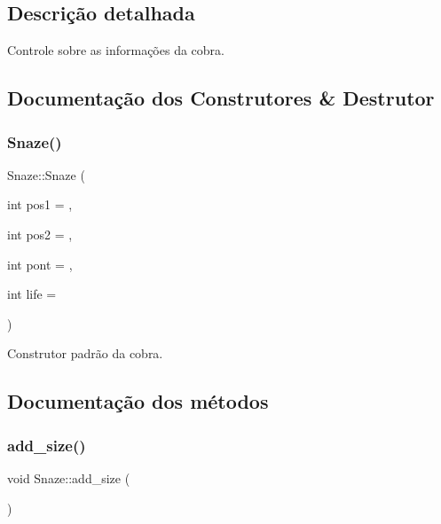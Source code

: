 \subsection{Descrição detalhada}
Controle sobre as informações da cobra. 

\subsection{Documentação dos Construtores \& Destrutor}
\mbox{\label{classSnaze_adfe6d312b7839c8e81d9c05c43367870}} 
\subsubsection{\texorpdfstring{Snaze()}{Snaze()}}
{\footnotesize\ttfamily Snaze\+::\+Snaze (\begin{DoxyParamCaption}\item[{int}]{pos1 = {},  }\item[{int}]{pos2 = {},  }\item[{int}]{pont = {},  }\item[{int}]{life = {} }\end{DoxyParamCaption})\hspace{0.3cm}{\ttfamily [inline]}}



Construtor padrão da cobra. 



\subsection{Documentação dos métodos}
\mbox{\label{classSnaze_a1746ce635a204cc0bd4544e6cfbcbdbc}} 
\subsubsection{\texorpdfstring{add\+\_\+size()}{add\_size()}}
{\footnotesize\ttfamily void Snaze\+::add\+\_\+size (\begin{DoxyParamCaption}{ }\end{DoxyParamCaption})\hspace{0.3cm}{\ttfamily [inline]}}



